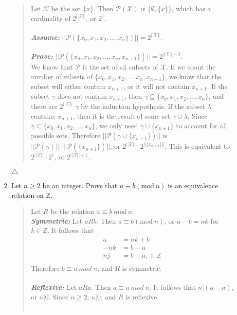 \documentclass{article}
\newcommand{\ZZ}{\mathbb{Z}}
\begin{document}
\begin{enumerate}
\begin{enumerate}
\begin{quote}
Let $\mathcal{X}$ be the set $\{x\}$.
Then $\mathcal{P}(\mathcal{X})$ is $\{\emptyset,\{x\}\}$, which has a cardinality of $2^{||\mathcal{X}||}$, or $2 ^{1}$.\\\\
\textit{\textbf{Assume:}} $||\mathcal{P}(\{x_{0}, x_{1}, x_{2}, \ldots, x_{n}\})|| = 2^{||\mathcal{X}||}$. \\\\
\textit{\textbf{Prove:}} $||\mathcal{P}(\{x_{0}, x_{1}, x_{2}, \ldots,x_{n}, x_{n+1}\})|| = 2^{||\mathcal{X}|| + 1}$.\\
We know that $\mathcal{P}$ is the set of all subsets of $\mathcal{X}$. 
If we count the number of subsets of $\{x_{0}, x_{1}, x_{2},\ldots,x_{n},x_{n+1}\}$, we know that the subset will either contain $x_{n+1}$, or it will not contain $x_{n+1}$.
If the subset $\gamma$ does not contain $x_{n+1}$, then $\gamma \subseteq \{x_{0},x_{1},x_{2},\ldots,x_{n}\}$, and there are $2^{||\mathcal{X}||}$ $\gamma$ by the induction hypothesis.
If the subset $\lambda$ contains $x_{n+1}$, then it is the result of some set $\gamma \cup \lambda$.
Since $\gamma \subseteq\{x_{0},x_{1},x_{2},\ldots,x_{n}\}$, we only need $\gamma \cup \{x_{n+1}\}$ to account for all possible sets.
Therefore $||\mathcal{P}(\gamma \cup \{x_{n+1}\})||$ is $||\mathcal{P}(\gamma)|| \cdot ||\mathcal{P}(\{x_{n+1}\})||$, or $2^{||\mathcal{X}||} \cdot 2^{||\{x_{n+1}\}||}$.
This is equivalent to $2^{||\mathcal{X}||}\cdot2^{1}$, or $2^{||\mathcal{X}|| + 1}$.
\end{quote}
$\triangle$
\item Let $n \geq 2$ be an integer.
Prove that $a \equiv b(\text{mod}\ n)$ is an equivalence relation on $\ZZ$.
\begin{quote}
Let $R$ be the relation $a\equiv b\ mod\ n$.\\
\textit{\textbf{Symmetric:}} Let $aRb$.
Then $a \equiv b(\text{mod}\ n)$, or $a - b = nk$ for $k\in\ZZ$.
It follows that
\begin{align*}
a &= nk + b\\
-nk &= b-a\\
nj &= b-a,\in\ZZ\\
\end{align*}
Therefore $b \equiv a\ mod\ n$, and $R$ is symmetric.\\\\
\textit{\textbf{Reflexive:}} Let $aRa$.
Then $a \equiv a\ mod\ n$.
It follows that $n|(a-a)$, or $n|0$.
Since $n \geq 2$, $n|0$, and $R$ is reflexive.\\\\

\end{quote}
\end{enumerate}
\end{enumerate}
\end{document}
